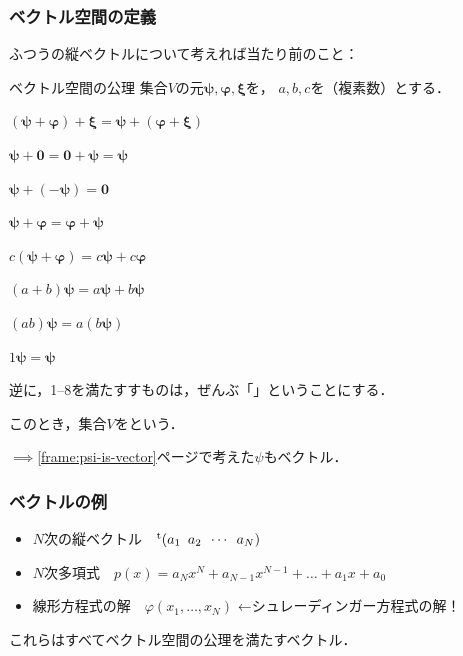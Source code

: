 \documentclass[
    10pt,
    ]{sotsu-beamer}
\begin{document}
\begin{frame}
    [label={frame:definition-of-vector-space}]
    \frametitle{ベクトル空間の定義}
    
    ふつうの縦ベクトルについて考えれば当たり前のこと：
    \begin{block}{ベクトル空間の公理}
        集合$V$の元$\symbf{\psi}, \symbf{\varphi}, \symbf{\xi}$を，
        $a, b, c$を（複素数）とする．
        \begin{enumerate}
            \begin{multicols}{2}
                \item $(\symbf{\psi} + \symbf{\varphi}) + \symbf{\xi} = \symbf{\psi} + (\symbf{\varphi} + \symbf{\xi})$
                \item $\symbf{\psi} + \symbf{0} = \symbf{0} + \symbf{\psi} = \symbf{\psi}$
                \item $\symbf{\psi} + (-\symbf{\psi}) = \symbf{0}$
                \item $\symbf{\psi} + \symbf{\varphi} = \symbf{\varphi} + \symbf{\psi}$
                \item $c (\symbf{\psi} + \symbf{\varphi}) = c \symbf{\psi} + c \symbf{\varphi}$
                \item $(a + b) \symbf{\psi} = a \symbf{\psi} + b \symbf{\psi}$
                \item $(ab) \symbf{\psi} = a(b\symbf{\psi})$
                \item $1 \symbf{\psi} = \symbf{\psi}$
            \end{multicols}
        \end{enumerate}
    \end{block}

    \pause

    \alert{逆に，1--8を満たすすものは，ぜんぶ「」ということにする}．
    
    このとき，集合$V$をという．
    
    $\implies$\ref{frame:psi-is-vector}ページで考えた$\psi$もベクトル．

\end{frame}


\begin{frame}
    \frametitle{ベクトルの例}

    \begin{itemize}
        \item $N$次の縦ベクトル　$\cvector{a_1 ; a_2 ; \cdots ; a_N}$
        \item $N$次多項式　$p(x) = a_N x^N + a_{N-1} x^{N-1} + \dots + a_1 x + a_0$
        \item 線形方程式の解　$\varphi(x_1, \dots, x_N)$
            ←\alert{シュレーディンガー方程式の解！}
    \end{itemize}
    これらはすべてベクトル空間の公理を満たすベクトル．
\end{frame}
\end{document}
